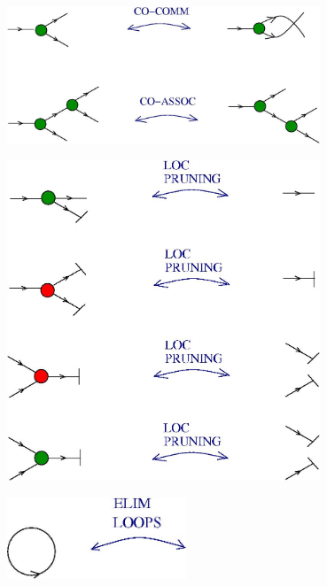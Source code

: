 \documentclass{article}
\begin{document}
\centerline{\includegraphics[width=0.7\textwidth]{../img/chemical-concrete-machine/convention_3.jpg}
}
\vspace{.5cm}


\vspace{.5cm}
 
\centerline{\includegraphics[width=0.7\textwidth]{../img/chemical-concrete-machine/convention_4.jpg}
}
\vspace{.5cm}

\vspace{.5cm}

\centerline{\includegraphics[width=0.4\textwidth]{../img/chemical-concrete-machine/convention_5.jpg}
}
\vspace{.5cm}

\vspace{.5cm}
 
\end{document}
